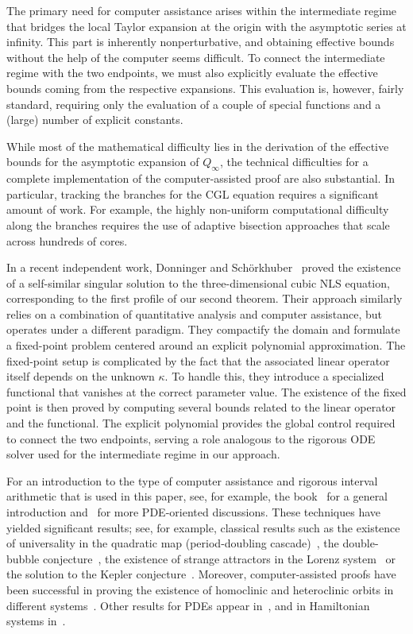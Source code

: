 \documentclass[11pt]{article}
\begin{document}
The primary need for computer assistance arises within the
intermediate regime that bridges the local Taylor expansion at the
origin with the asymptotic series at infinity. This part is inherently
nonperturbative, and obtaining effective bounds without the help of
the computer seems difficult. To connect the intermediate regime with
the two endpoints, we must also explicitly evaluate the effective
bounds coming from the respective expansions. This evaluation is,
however, fairly standard, requiring only the evaluation of a couple of
special functions and a (large) number of explicit constants.

While most of the mathematical difficulty lies in the derivation of
the effective bounds for the asymptotic expansion of \(Q_{\infty}\),
the technical difficulties for a complete implementation of the
computer-assisted proof are also substantial. In particular, tracking
the branches for the CGL equation requires a significant amount of
work. For example, the highly non-uniform computational difficulty
along the branches requires the use of adaptive bisection approaches
that scale across hundreds of cores.

In a recent independent work, Donninger and
Schörkhuber~\cite{Donninger2024} proved the existence of a
self-similar singular solution to the three-dimensional cubic NLS
equation, corresponding to the first profile of our second theorem.
Their approach similarly relies on a combination of quantitative
analysis and computer assistance, but operates under a different
paradigm. They compactify the domain and formulate a fixed-point
problem centered around an explicit polynomial approximation. The
fixed-point setup is complicated by the fact that the associated
linear operator itself depends on the unknown \(\kappa\). To handle
this, they introduce a specialized functional that vanishes at the
correct parameter value. The existence of the fixed point is then
proved by computing several bounds related to the linear operator and
the functional. The explicit polynomial provides the global control
required to connect the two endpoints, serving a role analogous to the
rigorous ODE solver used for the intermediate regime in our approach.

For an introduction to the type of computer assistance and rigorous
interval arithmetic that is used in this paper, see, for example, the
book~\cite{Tucker2011} for a general introduction and~\cite{Plumbook,
  GomezSerranoSEMA} for more PDE-oriented discussions. These
techniques have yielded significant results; see, for example,
classical results such as the existence of universality in the
quadratic map (period-doubling cascade)~\cite{Lanford}, the
double-bubble conjecture~\cite{Hass_1995}, the existence of strange
attractors in the Lorenz system~\cite{Tucker_1999} or the solution to
the Kepler conjecture~\cite{Hales2005}. Moreover, computer-assisted
proofs have been successful in proving the existence of homoclinic and
heteroclinic orbits in different systems~\cite{Zgliczynski98,
  Wilczak2020, Henot2023, Mireles2024}. Other results for PDEs appear
in~\cite{Fefferman86, Fefferman1996, Arioli2021}, and in Hamiltonian
systems in~\cite{Rana1991, Celletti1995, Figueras2016, Danesi2023,
  Capinski2023}.
\end{document}

